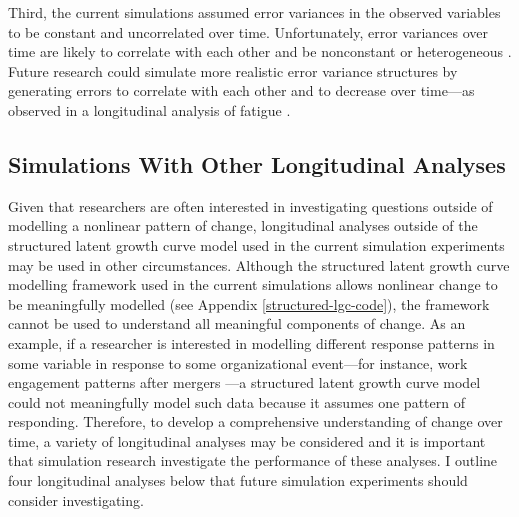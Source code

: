 \documentclass[
12pt, %
twoside,
english]{guelphthesis}
\begin{document}
Third, the current simulations assumed error variances in the observed variables to be constant and uncorrelated over time. Unfortunately, error variances over time are likely to correlate with each other and be nonconstant or heterogeneous \autocite{goldstein1994,deshon1998,bliese2002,braun2013,ding2016,lester2019,blozis2018}. Future research could simulate more realistic error variance structures by generating errors to correlate with each other and to decrease over time---as observed in a longitudinal analysis of fatigue \autocite{lang2018}.

\hypertarget{simulations-with-other-longitudinal-analyses}{%
\subsection{Simulations With Other Longitudinal Analyses}\label{simulations-with-other-longitudinal-analyses}}

Given that researchers are often interested in investigating questions outside of modelling a nonlinear pattern of change, longitudinal analyses outside of the structured latent growth curve model used in the current simulation experiments may be used in other circumstances. Although the structured latent growth curve modelling framework used in the current simulations allows nonlinear change to be meaningfully modelled (see Appendix \ref{structured-lgc-code}), the framework cannot be used to understand all meaningful components of change. As an example, if a researcher is interested in modelling different response patterns in some variable in response to some organizational event---for instance, work engagement patterns after mergers \autocite{seppälä2018}---a structured latent growth curve model could not meaningfully model such data because it assumes one pattern of responding. Therefore, to develop a comprehensive understanding of change over time, a variety of longitudinal analyses may be considered and it is important that simulation research investigate the performance of these analyses. I outline four longitudinal analyses below that future simulation experiments should consider investigating.
\end{document}
